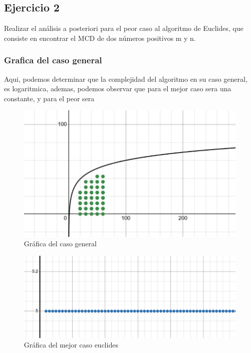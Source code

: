 \documentclass[12pt,twoside]{article}
\begin{document}
\subsection{Ejercicio 2}
Realizar el análisis a posteriori para el peor caso al algoritmo de Euclides, que consiste en encontrar el MCD de dos números positivos m y n.

\clearpage
\subsubsection{Grafica del caso general}
Aqui, podemos determinar que la complejidad del algoritmo en su caso general, es logaritmica, ademas, podemos observar que para el mejor caso sera una constante, y para el peor sera
\begin{figure}[h!]
\centering
\includegraphics[scale=0.7]{euclides.jpg}
\caption{Gráfica del caso general}
\label{fig:universe}
\end{figure}

\begin{figure}[h!]
\centering
\includegraphics[scale=0.7]{mejor_caso_euclides.jpg}
\caption{Gráfica del mejor caso euclides}
\label{fig:universe}
\end{figure}
\end{document}
